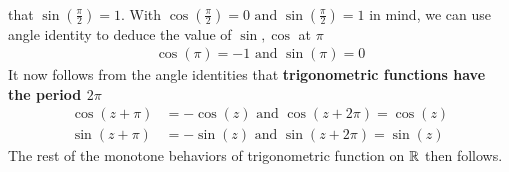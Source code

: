 \documentclass{report}
\begin{document}
\begin{mdframed}
\begin{align*}
\end{align*}
that $\sin (\frac{\pi}{2})=1$. With $\cos (\frac{\pi}{2})=0\text{ and }\sin (\frac{\pi}{2})=1$ in mind, we can use angle identity to deduce the value of $\sin,\cos$ at $\pi$
\begin{align*}
\cos (\pi)=-1\text{ and }\sin (\pi)=0
\end{align*}
It now follows from the angle identities that \textbf{trigonometric functions have the period $2\pi$} 
\begin{align*}
\cos (z+\pi)&= - \cos (z)\text{ and }\cos (z+2\pi)= \cos (z)\\
\sin (z+\pi)&=-\sin (z)\text{ and }\sin (z+2\pi)= \sin (z)
\end{align*}
The rest of the monotone behaviors of trigonometric function on  $\mathbb{R}$ then follows. 
\end{mdframed}
\end{document}
